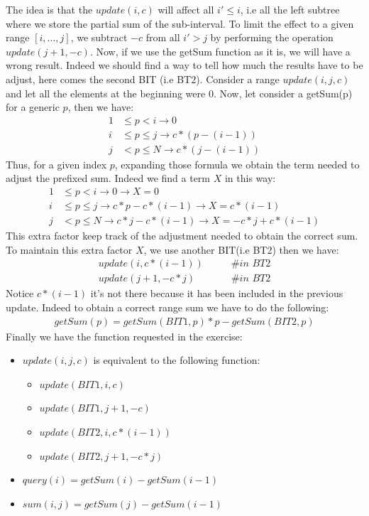 \documentclass[a4paper]{article}
\begin{document}
The idea is that the $update(i, c)$ will affect all $i' \leq i$, i.e all the left subtree where we store the partial sum of the sub-interval. To limit the effect to a given range $[i,...,j]$, we subtract $-c$ from all $i' > j$ by performing the operation $update(j+1, -c)$. Now, if we use the getSum function as it is, we will have a wrong result. Indeed we should find a way to tell how much the results have to be adjust, here comes the second BIT (i.e BT2). 
Consider a range $update(i,j,c)$ and let all the elements at the beginning were 0. Now, let consider a getSum(p) for a generic $p$, then we have:
\begin{align*}
1 & \leq p < i \longrightarrow 0 \\
i & \leq p \leq j \longrightarrow c*(p-(i-1))\\
j & < p \leq N \longrightarrow c*(j-(i-1))
\end{align*}
Thus, for a given index $p$, expanding those formula we obtain the term needed to adjust the prefixed sum. Indeed we find a term $X$ in this way:
\begin{align*}
1 & \leq p < i \longrightarrow 0 \longrightarrow X=0\\
i & \leq p \leq j \longrightarrow c*p - c*(i-1)\longrightarrow X= c*(i-1) \\
j & < p \leq N \longrightarrow c*j - c*(i-1) \longrightarrow X= -c*j + c*(i-1)
\end{align*}
This extra factor keep track of the adjustment needed to obtain the correct sum. To maintain this extra factor $X$, we use another BIT(i.e BT2) then we have:
\begin{align*}
update(i, c * (i-1))     \qquad     &\#\textit{in BT2} 	\\
update(j + 1, -c * j) 	\qquad	&\#\textit{in BT2}
\end{align*}
Notice $c*(i-1)$ it's not there because it has been included in the previous update. Indeed to obtain a correct range sum we have to do the following:
\begin{align*}
getSum(p)= getSum(BIT1,p) *p - getSum(BIT2,p)
\end{align*}
Finally we have the function requested in the exercise:
\begin{itemize}
\item $update(i, j, c)$ is equivalent to the following function:
\begin{itemize}
\item $update(BIT1,i, c)$
\item $update(BIT1,j + 1, -c)$
\item $update(BIT2,i, c * (i-1))$
\item $update(BIT2,j + 1, -c * j)$
\end{itemize} 
\item $query(i)= getSum(i)-getSum(i-1)$
\item $sum(i, j)=getSum(j)-getSum(i-1)$
\end{itemize} 
\end{document}
